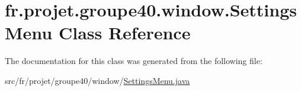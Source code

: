 \hypertarget{classfr_1_1projet_1_1groupe40_1_1window_1_1_settings_menu}{}\section{fr.\+projet.\+groupe40.\+window.\+Settings\+Menu Class Reference}
\label{classfr_1_1projet_1_1groupe40_1_1window_1_1_settings_menu}


The documentation for this class was generated from the following file\+:\begin{DoxyCompactItemize}
\item 
src/fr/projet/groupe40/window/\hyperlink{_settings_menu_8java}{Settings\+Menu.\+java}\end{DoxyCompactItemize}
